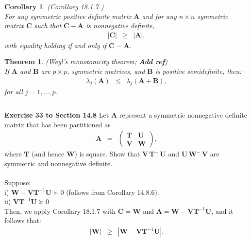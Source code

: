 \documentclass[a4paper]{article}
\theoremstyle{myexamplestyle}
\newtheorem{ther}{Theorem}
\newtheorem{coro}{Corollary}
\def\reminder#1{\marginpar{\rule[0pt]{1mm}{11pt}}\textbf{#1}}
\begin{document}
\begin{coro} ({\it Corollary 18.1.7} \citealp{Har2008})
\\
For any symmetric positive definite matrix $\mathbf{A}$ and for any $n \times n$ symmetric matrix $\mathbf{C}$ such that $\mathbf{C} - \mathbf{A}$ is nonnegative definite,
\begin{eqnarray*}
| \mathbf{C} | & \geq  & | \mathbf{A} |,
\end{eqnarray*}
with equality holding if and only if $\mathbf{C} = \mathbf{A} $.
\end{coro}


\begin{ther} (Weyl's monotonicity theorem; \reminder{Add ref})
\\
If $\mathbf{A}$ and $\mathbf{B}$ are $p \times p$, symmetric matrices, and $\mathbf{B}$ is positive semidefinite, then:
\begin{eqnarray*}
\lambda_j (\mathbf{A}) & \leq & \lambda_j ( \mathbf{A} + \mathbf{B} ),
\end{eqnarray*}
for all $j = 1, \ldots, p$.
\end{ther}


\[
\]

{\bf Exercise 33 to Section 14.8} \citep{Har2008} Let $\mathbf{A}$ represent a symmetric nonnegative definite matrix that has been partitioned as
\begin{eqnarray*}
\mathbf{A} & = &  \left( \begin{array}{cc} \mathbf{T} & \mathbf{U} \\ \mathbf{V} & \mathbf{W} \end{array} \right),
\end{eqnarray*}
where $\mathbf{T}$ (and hence $\mathbf{W}$) is square. Show that $\mathbf{V} \, \mathbf{T}^- \, \mathbf{U}$ and $\mathbf{U} \, \mathbf{W}^- \, \mathbf{V}$ are symmetric and nonnegative definite.
\\
\\
Suppose:
\\
i) $\mathbf{W} - \mathbf{V} \mathbf{T}^{-1} \mathbf{U} \succ 0$ (follows from Corollary 14.8.6).
\\
ii) $\mathbf{V} \mathbf{T}^{-1} \mathbf{U} \succeq 0$
\\
Then, we apply Corollary 18.1.7 with $\mathbf{C} = \mathbf{W}$ and $\mathbf{A} = \mathbf{W} - \mathbf{V} \mathbf{T}^{-1} \mathbf{U}$, and it follows that:
\begin{eqnarray*}
|\mathbf{W} | & \geq & | \mathbf{W} - \mathbf{V} \mathbf{T}^{-1} \mathbf{U} |.
\end{eqnarray*}
\end{document}
